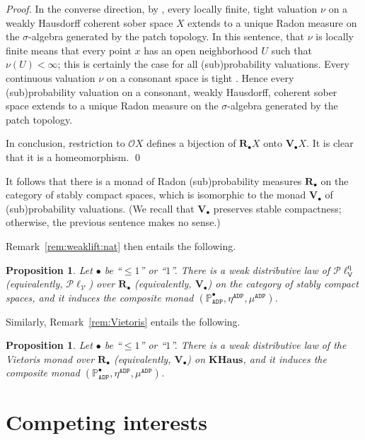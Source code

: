 \documentclass[preprint,12pt]{elsarticle}
\newcommand\Pred{\mathbb{P}}
\newcommand\Angel{{\mathtt{A}}}
\newcommand\Demon{{\mathtt{D}}}
\newcommand\Nature{{\mathtt{P}}}
\newcommand\ADN{{\Angel\Demon\Nature}}
\newcommand\Vt{\mathsf{V}}
\newcommand\quasi{\mathrm{q}} %
\newcommand\QL{\Plotkin^\quasi}
\newcommand\QLV{\QL_\Vt}
\newcommand\Plotkin{\mathcal P\ell} %
\newcommand\Plotkinn{\Plotkin_{\mathcal V}}
\newcommand\Val{{\mathbf V}}
\newcommand\Open{{\mathcal O}}
\newtheorem{proposition}[theorem]{Proposition}
\begin{document}
\begin{proof}
  In the converse direction, by \cite[Theorem~7.3]{KL:measureext},
  every locally finite, tight valuation $\nu$ on a weakly Hausdorff
  coherent sober space $X$ extends to a unique Radon measure on the
  $\sigma$-algebra generated by the patch topology.  In this sentence,
  that $\nu$ is locally finite means that every point $x$ has an open
  neighborhood $U$ such that $\nu (U) < \infty$; this is certainly the
  case for all (sub)probability valuations.  Every continuous
  valuation $\nu$ on a consonant space is tight
  \cite[Lemma~6.2]{JGL:kolmogorov}.  Hence every (sub)probability
  valuation on a consonant, weakly Hausdorff, coherent sober space
  extends to a unique Radon measure on the $\sigma$-algebra generated
  by the patch topology.

  In conclusion, restriction to $\Open X$ defines a bijection of
  $\mathbf R_\bullet X$ onto $\Val_\bullet X$.  It is clear that it is
  a homeomorphism.  \qed
\end{proof}

It follows that there is a monad of Radon (sub)probability measures
$\mathbf R_\bullet$ on the category of stably compact spaces, which is
isomorphic to the monad $\Val_\bullet$ of (sub)probability valuations.
(We recall that $\Val_\bullet$ preserves stable compactness;
otherwise, the previous sentence makes no sense.)

Remark~\ref{rem:weaklift:nat} then entails the following.
\begin{proposition}
  \label{prop:weaklift:nat:radon}
  Let $\bullet$ be ``$\leq 1$'' or ``$1$''.  There is a weak
  distributive law of $\QLV$ (equivalently, $\Plotkinn$) over
  $\mathbf R_\bullet$ (equivalently, $\Val_\bullet$) on the category
  of stably compact spaces, and it induces the composite monad
  $(\Pred_\ADN^\bullet, \eta^\ADN, \mu^\ADN)$.
\end{proposition}

Similarly, Remark~\ref{rem:Vietoris} entails the following.
\begin{proposition}
  \label{prop:Vietoris}
  Let $\bullet$ be ``$\leq 1$'' or ``$1$''.  There is a weak
  distributive law of the Vietoris monad over $\mathbf R_\bullet$
  (equivalently, $\Val_\bullet$) on $\mathbf{KHaus}$, and it induces
  the composite monad $(\Pred_\ADN^\bullet, \eta^\ADN, \mu^\ADN)$.
\end{proposition}


\section*{Competing interests}
\end{document}
